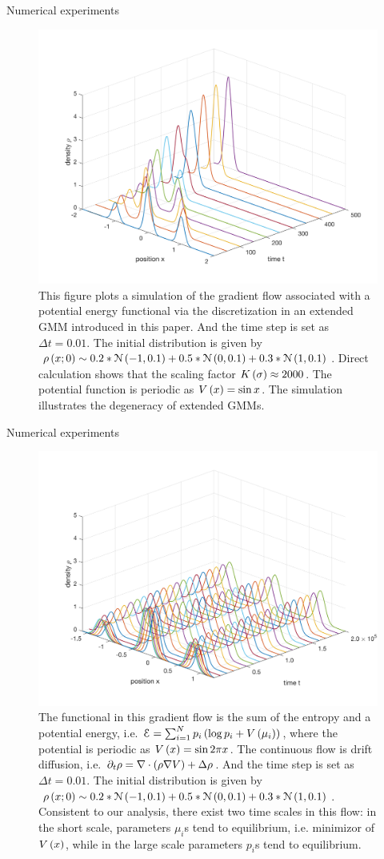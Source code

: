 \documentclass{beamer}
\begin{document}
\begin{frame}{Numerical experiments}
\begin{figure}[h]
  \centering
  \centerline{\includegraphics[width=0.7\linewidth]{degeneracy.jpg}}
  \caption{
  \scriptsize{
  This figure plots a simulation of the gradient flow associated with a potential energy functional via the discretization in an extended GMM introduced in this paper. And the time step is set as $\Delta t = 0.01$. The initial distribution is given by $\rho\left( x; 0 \right) \sim 0.2 * \mathcal{N}\left( -1, 0.1 \right) + 0.5 * \mathcal{N}\left( 0, 0.1 \right) + 0.3 * \mathcal{N}\left( 1, 0.1 \right)$. Direct calculation shows that the scaling factor $K\left( \sigma \right) \approx 2000$. The potential function is periodic as $V\left( x \right) = \sin x$. The simulation illustrates the degeneracy of extended GMMs.}}
\end{figure}
\end{frame}

\begin{frame}{Numerical experiments}
\begin{figure}[h]
  \centering
  \centerline{\includegraphics[width=0.6\linewidth]{mixed1.jpg}}
  \caption{
  \scriptsize{
The functional in this gradient flow is the sum of the entropy and a potential energy, i.e. $\mathcal{E} = \sum_{i = 1}^N p_i\left( \log p_i + V\left( \mu_i \right) \right)$, where the potential is periodic as $V\left( x \right) = \sin 2\pi x$. The continuous flow is drift diffusion, i.e. $\partial_t \rho = \nabla \cdot \left( \rho \nabla V \right) + \Delta \rho$. And the time step is set as $\Delta t = 0.01$. The initial distribution is given by $\rho\left( x; 0 \right) \sim 0.2 * \mathcal{N}\left( -1, 0.1 \right) + 0.5 * \mathcal{N}\left( 0, 0.1 \right) + 0.3 * \mathcal{N}\left( 1, 0.1 \right)$. Consistent to our analysis, there exist two time scales in this flow: in the short scale, parameters $\mu_i$s tend to equilibrium, i.e. minimizor of $V\left( x \right)$, while in the large scale parameters $p_i$s tend to equilibrium.}}
\end{figure}
\end{frame}
\end{document}
